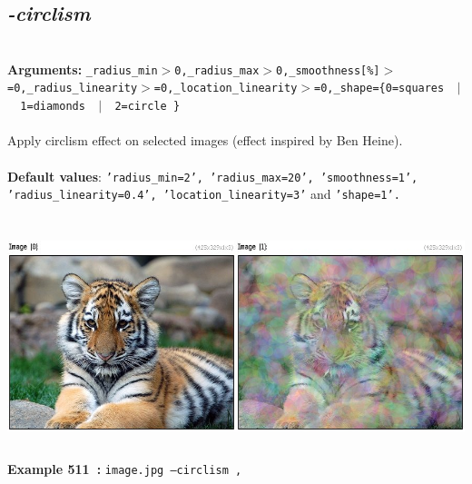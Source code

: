 \documentclass[a4paper,11pt,twoside]{book}
\begin{document}
\subsection{\emph{-circlism} }\vspace*{-0.5em}
~\\\textbf{Arguments: } 
{\small \texttt{\_radius\_min$>$0,\_radius\_max$>$0,\_smoothness[\%]$>$=0,\_radius\_linearity$>$=0,\_location\_linearity$>$=0,\_shape=\{0=squares ~$|$~ 1=diamonds ~$|$~ 2=circle \}}}\\~\\
Apply circlism effect on selected images (effect inspired by Ben Heine).
~\\~\\\textbf{Default values}: {\small \texttt{'radius\_min=2', 'radius\_max=20', 'smoothness=1', 'radius\_linearity=0.4', 'location\_linearity=3'} and \texttt{'shape=1'.}}
\begin{center}\includegraphics[keepaspectratio=true,height=7cm,width=\textwidth]{img/gmic_def511.jpg}\\
{\footnotesize \textbf{Example 511~:} \texttt{image.jpg --circlism ,}}
\end{center}
\end{document}
